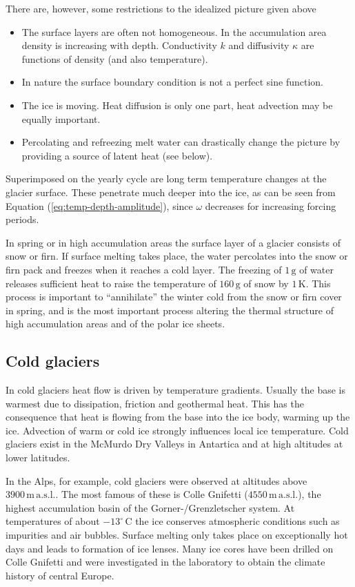 \documentclass[parskip=half]{scrartcl}
\newcommand{\unit}[1]{\ensuremath{\,\mathrm{#1}}}
\newcommand{\cels}[1]{\ensuremath{#1^{\circ}\,\mathrm{C}}}
\begin{document}
There are, however, some restrictions to the idealized picture given
above
%
\begin{itemize}
\item The surface layers are often not homogeneous.  In the
accumulation area density is increasing with depth. Conductivity $k$
and diffusivity $\kappa$ are functions of density (and also
temperature).
\item In nature the surface boundary condition is not a perfect sine
function.
\item The ice is moving.  Heat diffusion is only one part, heat
advection may be equally important.
\item Percolating and refreezing melt water can drastically change the
picture by providing a source of latent heat (see below).
\end{itemize}
%
Superimposed on the yearly cycle are long term temperature changes at
the glacier surface.  These penetrate much deeper into the ice, as can
be seen from Equation (\ref{eq:temp-depth-amplitude}), since $\omega$
decreases for increasing forcing periods.

In spring or in high accumulation areas the surface layer of a glacier
consists of snow or firn.  If surface melting takes place, the water
percolates into the snow or firn pack and freezes when it reaches a
cold layer.  The freezing of $1\unit{g}$ of water releases sufficient
heat to raise the temperature of $160\unit{g}$ of snow by $1\unit{K}$.
This process is important to ``annihilate'' the winter cold from the
snow or firn cover in spring, and is the most important process
altering the thermal structure of high accumulation areas and of the
polar ice sheets.


\subsection{Cold glaciers}
\label{sec:cold-glaciers}

In cold glaciers heat flow is driven by temperature gradients.
Usually the base is warmest due to dissipation, friction and
geothermal heat.  This has the consequence that heat is flowing from
the base into the ice body, warming up the ice.  Advection of warm or
cold ice strongly influences local ice temperature. Cold glaciers
exist in the McMurdo Dry Valleys in Antartica and at high altitudes at
lower latitudes.

In the Alps, for example, cold glaciers were observed at altitudes
above $3900\unit{m}\unit{a.s.l.}$.  The most famous of these is Colle
Gnifetti ($4550 \unit{m}\unit{a.s.l.}$), the highest accumulation
basin of the Gorner-/Grenzletscher system.  At temperatures of about
\cels{-13} the ice conserves atmospheric conditions such as impurities
and air bubbles.  Surface melting only takes place on exceptionally
hot days and leads to formation of ice lenses.  Many ice cores have
been drilled on Colle Gnifetti and were investigated in the laboratory
to obtain the climate history of central Europe.
\end{document}
